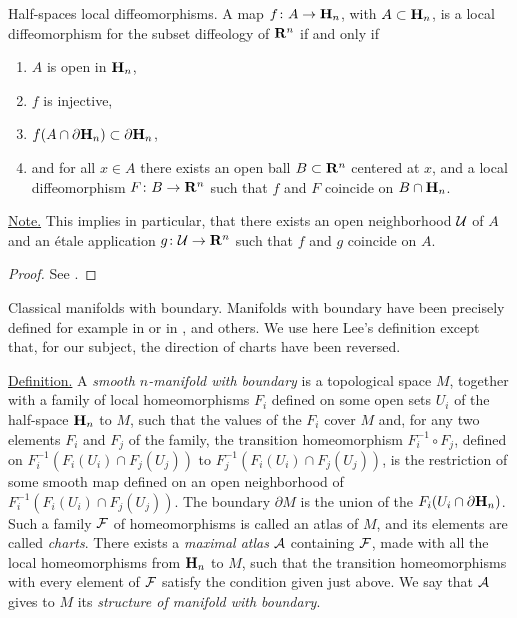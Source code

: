 \begin{Article}{Half-spaces local diffeomorphisms.}{}
  \label{Local-diffeomorphisms-of-half-spaces}
  A map $f \colon A \to {\mathbf H}_n$,
  with $A \subset {\mathbf H}_n$,
  is a local diffeomorphism for the subset diffeology of $\mathbf{R}^n$ if and only if
  \begin{enumerate}
    \item $A$ is open in ${\mathbf H}_n$,
    \item $f$ is injective,
    \item $f(A \cap \partial {\mathbf H}_n) \subset \partial {\mathbf H}_n$,
    \item and for all $x \in A$ there exists an open ball $B \subset \mathbf{R}^n$ centered at $x$,
    and a local diffeomorphism $F \colon B \to \mathbf{R}^n$ such that $f$ and $F$ coincide on $B \cap {\mathbf H}_n$.
  \end{enumerate}

  \uline{Note.} This implies in particular,
  that there exists an open neighborhood $\mathcal{U}$ of $A$ and an \'etale application $g \colon \mathcal{U} \to \mathbf{R}^n$ such that $f$ and $g$ coincide on $A$.
\end{Article} %

\begin{proof}
  See \cite[\textsection\,4.14]{PIZ13}.
\end{proof}

\begin{Article}{Classical manifolds with boundary.}{}
  \label{Classical-manifolds-with-boundary}
  Manifolds with boundary%
  \linebreak%
  have been precisely defined for example in \cite{GP74} or in \cite{Lee06},
  and others.
  We use here Lee's definition except that,
  for our subject,
  the direction of charts have been reversed.

  \uline{Definition.} A \emph{smooth $n$-manifold with boundary\/} is a topological space $M$,
  together with a family of local homeomorphisms $F_i$ defined on some open sets $U_i$ of the half-space ${\mathbf H}_n$ to $M$,
  such that the values of the $F_i$ cover $M$ and,
  for any two elements $F_i$ and $F_j$ of the family,
  the transition homeomorphism $F_i^{-1} \circ F_j$,
  defined on $F_i^{-1}(F_i(U_i) \cap F_j(U_j))$ to $F_j^{-1}(F_i(U_i) \cap F_j(U_j))$,
  is the restriction of some smooth map defined on an open neighborhood of $F_i^{-1}(F_i(U_i) \cap F_j(U_j))$.
  The boundary $\partial M$ is the union of the $F_i(U_i \cap \partial {\mathbf H}_n)$.
  Such a family $\mathcal{F}$ of homeomorphisms is called an atlas of $M$,
  and its elements are called {\em charts\/}.
  There exists a \emph{maximal atlas} $\mathcal{A}$ containing $\mathcal{F}$,
  made with all the local homeomorphisms from ${\mathbf H}_n$ to $M$,
  such that the transition homeomorphisms with every element of $\mathcal{F}$ satisfy the condition given just above.
  We say that $\mathcal{A}$ gives to $M$ its \emph{structure of manifold with boundary}.
\end{Article} %

